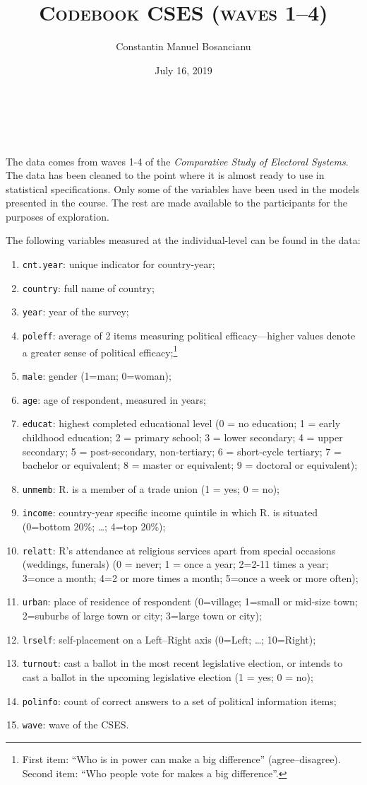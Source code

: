\documentclass[12pt,english]{article}
\title{\textsc{Codebook CSES (waves 1--4)}}
\author{Constantin Manuel Bosancianu}
\affil{WZB Berlin Social Science Center \\ \textit{Institutions and Political Inequality}}
\date{July 16, 2019}
\makeatletter
\renewcommand{\maketitle}{
  \begin{flushleft}
    {\huge\@title}\\
    \vspace{10pt}
    {\large\@author}\\
    {\@date}
    \vspace{40pt}
  \end{flushleft}
}
\makeatother
\begin{document}
\maketitle

The data comes from waves 1-4 of the \textit{Comparative Study of Electoral Systems}. The data has been cleaned to the point where it is almost ready to use in statistical specifications. Only some of the variables have been used in the models presented in the course. The rest are made available to the participants for the purposes of exploration.

The following variables measured at the individual-level can be found in the data:

\begin{enumerate}
  \item \texttt{cnt.year}: unique indicator for country-year;
  \item \texttt{country}: full name of country;
  \item \texttt{year}: year of the survey;
  \item \texttt{poleff}: average of 2 items measuring political efficacy---higher values denote a greater sense of political efficacy;\footnote{First item: ``Who is in power can make a big difference'' (agree--disagree). Second item: ``Who people vote for makes a big difference''.}
  \item \texttt{male}: gender (1=man; 0=woman);
  \item \texttt{age}: age of respondent, measured in years;
  \item \texttt{educat}: highest completed educational level (0 = no education; 1 = early childhood education; 2 = primary school; 3 = lower secondary; 4 = upper secondary; 5 = post-secondary, non-tertiary; 6 = short-cycle tertiary; 7 = bachelor or equivalent; 8 = master or equivalent; 9 = doctoral or equivalent);
  \item \texttt{unmemb}: R. is a member of a trade union (1 = yes; 0 = no);
  \item \texttt{income}: country-year specific income quintile in which R. is situated (0=bottom 20\%; \dots; 4=top 20\%);  
  \item \texttt{relatt}: R's attendance at religious services apart from special occasions (weddings, funerals) (0 = never; 1 = once a year; 2=2-11 times a year; 3=once a month; 4=2 or more times a month; 5=once a week or more often);
  \item \texttt{urban}: place of residence of respondent (0=village; 1=small or mid-size town; 2=suburbs of large town or city; 3=large town or city);
  \item \texttt{lrself}: self-placement on a Left--Right axis (0=Left; \dots; 10=Right);
  \item \texttt{turnout}: cast a ballot in the most recent legislative election, or intends to cast a ballot in the upcoming legislative election (1 = yes; 0 = no);
  \item \texttt{polinfo}: count of correct answers to a set of political information items;
  \item \texttt{wave}: wave of the CSES.
\end{enumerate}
\end{document}
